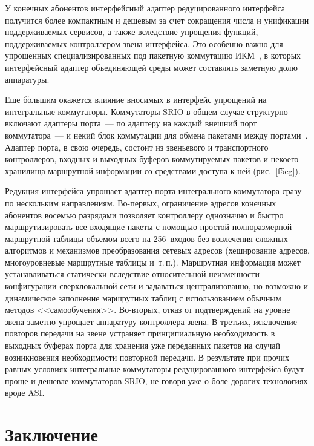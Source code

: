 \begin{multicols}{2}
     У конечных абонентов интерфейсный адаптер редуцированного интерфейса получится 
более компактным и дешевым за счет сокращения числа и унификации поддерживаемых 
сервисов, а также вследствие упрощения функций, поддерживаемых контроллером звена 
интерфейса. Это особенно важно для упрощенных специализированных под пакетную 
коммутацию ИКМ~\cite{8eg}, в которых интерфейсный адаптер объединяющей среды 
может составлять заметную долю аппаратуры.
     
     Еще б$\acute{\mbox{о}}$льшим окажется влияние вносимых в интерфейс упрощений 
на интегральные коммутаторы. Коммутаторы SRIO в общем случае структурно включают 
адаптеры порта~--- по адаптеру на каждый внешний порт коммутатора~--- и некий блок 
коммутации для обмена пакетами между портами~\cite{9eg}. Адаптер порта, в свою очередь, 
состоит из звеньевого и транспортного контроллеров, входных и выходных буферов 
коммутируемых пакетов и некоего хранилища маршрутной информации со средствами 
доступа к ней (рис.~\ref{f5eg}).


     Редукция интерфейса упрощает адаптер порта интегрального коммутатора сразу по 
нескольким направлениям. Во-первых, ограничение адресов конечных абонентов восемью 
разрядами позволяет контроллеру однозначно и быстро маршрутизировать все входящие 
пакеты с помощью простой полноразмерной маршрутной таблицы объемом всего на 
256~входов без вовлечения сложных алгоритмов и механизмов преобразования сетевых 
адресов (хеширование адресов, многоуровневые маршрутные таблицы и~т.\,п.). Маршрутная 
информация может устанавливаться статически вследствие относительной неизменности 
конфигурации сверхлокальной сети и задаваться централизованно, но возможно и 
динамическое заполнение маршрутных таблиц с использованием обычным методов 
<<самообучения>>. Во-вторых, отказ от подтверждений на уровне звена заметно упрощает 
аппаратуру контроллера звена. В-третьих, исключение повторов передачи на звене устраняет 
принципиальную необходимость в выходных буферах порта для хранения уже переданных 
пакетов на случай возникновения необходимости повторной передачи. В результате при 
прочих равных условиях интегральные коммутаторы редуцированного интерфейса будут 
проще и дешевле коммутаторов SRIO, не говоря уже о боле дорогих технологиях вроде ASI.

\vspace*{-4pt}

\section{Заключение}


\end{multicols}
